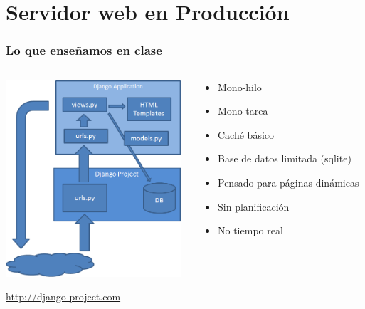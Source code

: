 %
%

\section{Servidor web en Producción}

\begin{frame}
\frametitle{Lo que enseñamos en clase}

\begin{columns}[T]
\begin{column}{.48\textwidth}
\includegraphics[width=6.5cm]{figs/django}

\begin{flushright}
  {\Large
    \url{http://django-project.com}
  }
\end{flushright}

\end{column}%
\hfill%
\begin{column}{.50\textwidth}
{\Large
\begin{itemize}
  \item Mono-hilo
  \item Mono-tarea
  \item Caché básico
  \item Base de datos limitada (sqlite)
  \item Pensado para páginas dinámicas
  \item Sin planificación
  \item No tiempo real
\end{itemize}
}
\end{column}%
\end{columns}

\end{frame}


